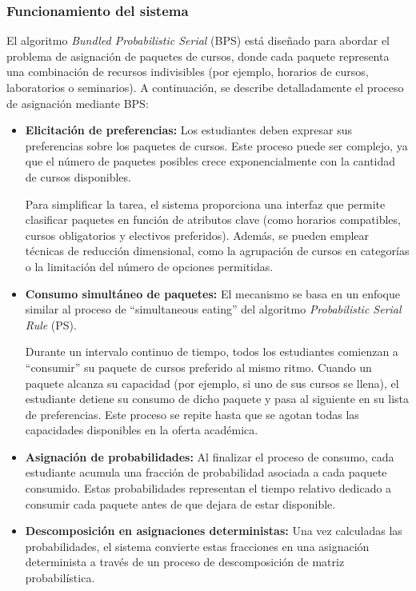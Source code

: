 \documentclass{article}
\begin{document}
\subsubsection{Funcionamiento del sistema}

El algoritmo \textit{Bundled Probabilistic Serial} (BPS) está diseñado para abordar el problema de asignación de paquetes de cursos, donde cada paquete representa una combinación de recursos indivisibles (por ejemplo, horarios de cursos, laboratorios o seminarios). A continuación, se describe detalladamente el proceso de asignación mediante BPS:

\begin{itemize}
    \item \textbf{Elicitación de preferencias:} Los estudiantes deben expresar sus preferencias sobre los paquetes de cursos. Este proceso puede ser complejo, ya que el número de paquetes posibles crece exponencialmente con la cantidad de cursos disponibles.

    Para simplificar la tarea, el sistema proporciona una interfaz que permite clasificar paquetes en función de atributos clave (como horarios compatibles, cursos obligatorios y electivos preferidos). Además, se pueden emplear técnicas de reducción dimensional, como la agrupación de cursos en categorías o la limitación del número de opciones permitidas.

    \item \textbf{Consumo simultáneo de paquetes:} El mecanismo se basa en un enfoque similar al proceso de ``simultaneous eating'' del algoritmo \textit{Probabilistic Serial Rule} (PS).

    Durante un intervalo continuo de tiempo, todos los estudiantes comienzan a ``consumir'' su paquete de cursos preferido al mismo ritmo. Cuando un paquete alcanza su capacidad (por ejemplo, si uno de sus cursos se llena), el estudiante detiene su consumo de dicho paquete y pasa al siguiente en su lista de preferencias. Este proceso se repite hasta que se agotan todas las capacidades disponibles en la oferta académica.

    \item \textbf{Asignación de probabilidades:} Al finalizar el proceso de consumo, cada estudiante acumula una fracción de probabilidad asociada a cada paquete consumido. Estas probabilidades representan el tiempo relativo dedicado a consumir cada paquete antes de que dejara de estar disponible.

    \item \textbf{Descomposición en asignaciones deterministas:} Una vez calculadas las probabilidades, el sistema convierte estas fracciones en una asignación determinista a través de un proceso de descomposición de matriz probabilística.


\end{itemize}
\end{document}
